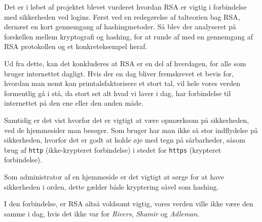 Det er i løbet af projektet blevet vurderet hvordan RSA er vigtig i forbindelse med sikkerheden ved logins.
Først ved en redegørelse af talteorien bag RSA, dernæst en kort gennemgang af hashingmetoder.
Så blev der analyseret på forskellen mellem kryptografi og hashing, for at runde af med en gennemgang af RSA protokollen og et konkreteksempel heraf.
\par
Ud fra dette, kan det konkluderes at RSA er en del af hverdagen, for alle som bruger internettet dagligt.
Hvis der en dag bliver fremskrevet et bevis for, hvordan man nemt kan primtalsfaktorisere et stort tal, vil hele vores verden formentlig gå i stå, da stort set alt hvad vi laver i dag, har forbindelse til internettet på den ene eller den anden måde.

Samtidig er det vist hvorfor det er vigtigt at være opmærksom på sikkerheden, ved de hjemmesider man besøger.
Som bruger har man ikke så stor indflydelse på sikkerheden, hvorfor det er godt at holde øje med tegn på sårbarheder, såsom brug af \texttt{http} (ikke-krypteret forbindelse) i stedet for \texttt{https} (krypteret forbindelse).

Som administrator af en hjemmeside er det vigtigt at sørge for at have sikkerheden i orden, dette gælder både kryptering såvel som hashing.

I den forbindelse, er RSA altså voldsomt vigtig, vores verden ville ikke være den samme i dag, hvis det ikke var for \textit{Rivers}, \textit{Shamir} og \textit{Adleman}.

